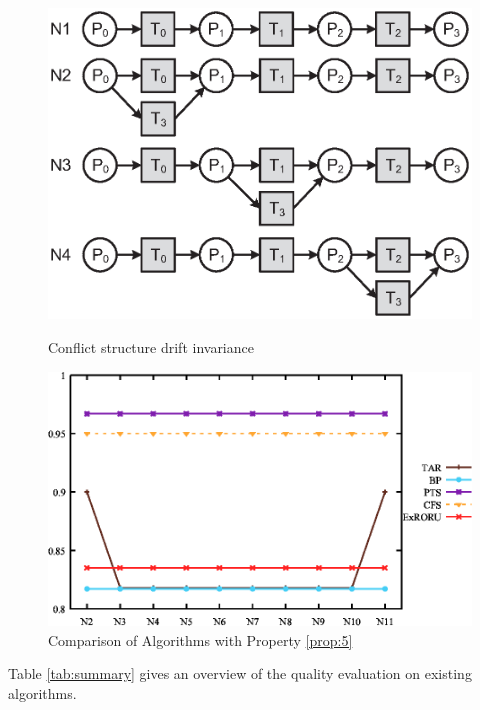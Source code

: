 \documentclass{llncs}
\begin{document}
\begin{figure}[ht]
\centering
\begin{minipage}[t]{0.45\textwidth}
	\centering
	\includegraphics[width=1\textwidth]{fig_property_5.eps}
	\caption{Conflict structure drift invariance}
	\label{fig:property5}
\end{minipage}
\hspace{0.1in}
\begin{minipage}[t]{0.45\textwidth}
	\centering
	\includegraphics[width=1\textwidth]{fig_property_5_comp.eps}
	\caption{Comparison of Algorithms with Property \ref{prop:5}}
	\label{fig:property5comp}
\end{minipage}
\end{figure}

Table \ref{tab:summary} gives an overview of the quality evaluation on existing algorithms.
\end{document}
